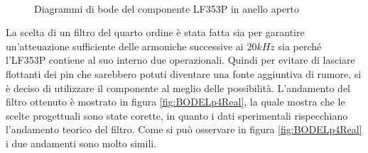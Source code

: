 \documentclass[titlepage]{report}
\begin{document}
	\begin{figure}[h]
	     	\centering
	     	 \qquad
	     	 \\
	     	\caption{Diagrammi di bode del componente LF353P in anello aperto}
	     	\label{fig:bode_LF353P}
	     \end{figure}

	La scelta di un filtro del quarto ordine è stata fatta sia per garantire un'atteuazione sufficiente delle armoniche successive ai $20kHz$ sia perché l'LF353P contiene al suo interno due operazionali. Quindi per evitare di lasciare flottanti dei pin che sarebbero potuti diventare una fonte aggiuntiva di rumore, si è deciso di utilizzare il componente al meglio delle possibilità.
	L'andamento del filtro ottenuto è mostrato in figura \ref{fig:BODELp4Real}, la quale mostra che le scelte progettuali sono state corette, in quanto i dati sperimentali rispecchiano l'andamento teorico del filtro.
	Come si può osservare in figura \ref{fig:BODELp4Real} i due andamenti sono molto simili.
	
\end{document}
